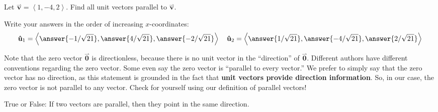 \documentclass{ximera}
\begin{document}
\begin{question}
  Let $\overset{\rightharpoonup}{\mathbf{v}} = \left\langle 1,-4,2 \right\rangle$. Find all unit vectors parallel to $\overset{\rightharpoonup}{\mathbf{v}}$.
  \begin{prompt}
    Write your answers in the order of increasing $x$-coordinates:
    \[
    \mathbf{\hat{u}}_1 = \left\langle \answer{-1/\sqrt{21}},\answer{4/\sqrt{21}},\answer{-2/\sqrt{21}} \right\rangle \quad \mathbf{\hat{u}}_2 = \left\langle \answer{1/\sqrt{21}},\answer{-4/\sqrt{21}},\answer{2/\sqrt{21}} \right\rangle
    \]
  \end{prompt}
\end{question}


Note that the zero vector $\overset{\rightharpoonup}{\mathbf{0}}$ is directionless, because
there is no unit vector in the ``direction'' of $\overset{\rightharpoonup}{\mathbf{0}}$. Different
authors have different conventions regarding the zero vector. Some
even say the zero vector is ``parallel to every vector.'' We prefer to simply say
that the zero vector has no direction, as this statement is grounded in the fact
that \textbf{unit vectors provide direction information}.  So, in our case, 
the zero vector is not parallel to any vector.  Check for yourself 
using our definition of parallel vectors!

\begin{question}
  True or False: If two vectors are parallel, then they point in the same direction.
  \begin{prompt}
    \begin{multipleChoice}
    \end{multipleChoice}
  \end{prompt}
\end{question}
\end{document}
